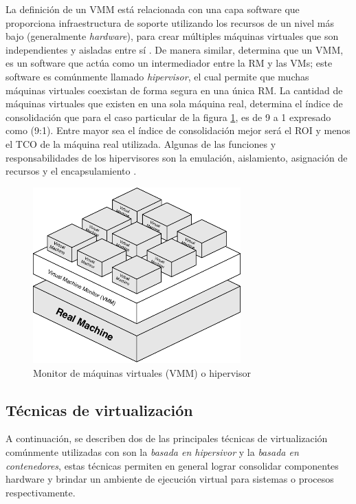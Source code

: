 La definición de un VMM está relacionada con una capa software que proporciona  infraestructura de soporte utilizando los recursos de un nivel más bajo (generalmente \textit{hardware}), para crear múltiples máquinas virtuales que son independientes y aisladas entre sí \parencite{Chiueh2005, Cafaro2011}. De manera similar, \textcite{Stallings2015}  determina  que un VMM, es un software que actúa como un intermediador entre la RM y las VMs; este software es comúnmente llamado \textit{hipervisor}, el cual permite que muchas máquinas virtuales coexistan de forma segura en una única RM. La cantidad de máquinas virtuales que existen en una sola máquina real, determina el índice de consolidación que para el caso particular de la figura \ref{fig:VMM}, es de 9 a 1 expresado como (9:1). Entre mayor sea el índice de consolidación mejor será el ROI y menos el TCO de la máquina real utilizada. Algunas de las funciones y responsabilidades de los hipervisores son la emulación, aislamiento, asignación de recursos y el encapsulamiento \parencite{Hoopes2009}.

\begin{figure}[!hbtp]
	\centering
	\includegraphics[width=8cm]{Pictures/VMMGeneric.pdf}
	\vspace{-0.2cm}
	\caption{Monitor de máquinas virtuales (VMM) o hipervisor}
	\label{fig:VMM}
\end{figure}

\subsection{Técnicas de virtualización}\label{sec:técnicas}
\vspace{5mm}
A continuación, se describen dos de las principales técnicas de virtualización comúnmente utilizadas con son la \textit{basada en hipersivor} y la \textit{basada en contenedores}, estas técnicas permiten en general lograr consolidar componentes hardware y brindar un ambiente de ejecución virtual para sistemas o procesos respectivamente.

